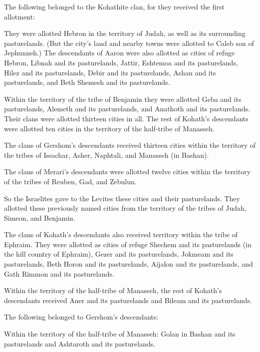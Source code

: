 {\par }{\PP The following belonged to the Kohathite
clan,
for
they
received the first allotment:
\par }{\PP {}They
were allotted
Hebron
in the territory
of Judah,
as well as its surrounding
pasturelands.
(But the city’s land
and nearby towns
were allotted
to Caleb
son
of Jephunneh.)
The descendants
of Aaron
were also allotted
as cities
of refuge
Hebron,
Libnah
and its pasturelands,
Jattir,
Eshtemoa
and its pasturelands,
Hilez
and its pasturelands,
Debir
and its pasturelands,
Ashan
and its pasturelands,
and Beth Shemesh
and its pasturelands.
\par }{\PP {}Within the territory of the tribe
of Benjamin
they were allotted Geba
and its pasturelands,
Alemeth
and its pasturelands,
and Anathoth
and its
pasturelands.
Their clans
were allotted
thirteen
cities
in all.
The rest of Kohath’s
descendants
were allotted
ten
cities
in the territory of the half-tribe
of Manasseh.
\par }{\PP {}The clans
of
Gershom’s
descendants
received thirteen
cities
within the territory of the tribes
of Issachar,
Asher,
Naphtali,
and Manasseh
(in Bashan).
\par }{\PP {}The clans
of
Merari’s
descendants
were allotted
twelve
cities
within the territory of the tribes
of Reuben,
Gad,
and Zebulun.
\par }{\PP {}So the Israelites
gave
to the Levites
these cities
and their pasturelands.
They allotted
these
previously named
cities
from the territory of the tribes
of Judah,
Simeon,
and Benjamin.
\par }{\PP {}The clans
of Kohath’s
descendants
also received territory
within the tribe
of Ephraim.
They were allotted
as cities
of refuge
Shechem
and its
pasturelands
(in the hill country
of Ephraim), Gezer
and its
pasturelands,
Jokmeam
and its pasturelands,
Beth Horon
and its pasturelands,
Aijalon
and its pasturelands,
and Gath Rimmon
and its pasturelands.
\par }{\PP {}Within the territory of the half-tribe
of Manasseh,
the rest of Kohath’s
descendants
received
Aner
and its pasturelands
and Bileam
and its pasturelands.
\par }{\PP {}The following belonged to Gershom’s
descendants:
\par }{\PP Within the territory
of the half-tribe
of Manasseh: Golan
in Bashan
and its pasturelands
and Ashtaroth
and its
pasturelands.
}
